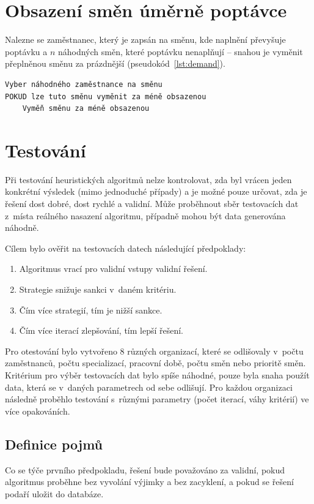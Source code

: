 \documentclass[a4paper,11pt,openany,twoside]{book}
\begin{document}
\section{Obsazení směn úměrně poptávce}
Nalezne se zaměstnanec, který je zapsán na směnu, kde naplnění převyšuje poptávku a $n$ náhodných směn, které poptávku nenaplňují – snahou je vyměnit přeplněnou směnu za prázdnější (pseudokód~\ref{lst:demand}).

\begin{lstlisting}[caption={Strategie pro obsazení směn dle poptávky}, label={lst:demand}]
Vyber náhodného zaměstnance na směnu
POKUD lze tuto směnu vyměnit za méně obsazenou
	Vyměň směnu za méně obsazenou
\end{lstlisting}

\section{Testování}

Při testování heuristických algoritmů nelze kontrolovat, zda byl vrácen jeden konkrétní výsledek (mimo jednoduché případy) a je možné pouze určovat, zda je řešení dost dobré, dost rychlé a validní. Může proběhnout sběr testovacích dat z~místa reálného nasazení algoritmu, případně mohou být data generována náhodně. \cite{rardin2001experimental}

Cílem bylo ověřit na testovacích datech následující předpoklady:
\begin{enumerate}
	\item Algoritmus vrací pro validní vstupy validní řešení.
	\item Strategie snižuje sankci v~daném kritériu.
	\item Čím více strategií, tím je nižší sankce.
	\item Čím více iterací zlepšování, tím lepší řešení.
\end{enumerate}


Pro otestování bylo vytvořeno 8 různých organizací, které se odlišovaly v~počtu zaměstnanců, počtu specializací, pracovní době, počtu směn nebo prioritě směn. Kritérium pro výběr testovacích dat bylo spíše náhodné, pouze byla snaha použít data, která se v~daných parametrech od sebe odlišují. Pro každou organizaci následně proběhlo testování s~různými parametry (počet iterací, váhy kritérií) ve více opakováních.


\subsection{Definice pojmů}
Co se týče prvního předpokladu, řešení bude považováno za validní, pokud algoritmus proběhne bez vyvolání výjimky a bez zacyklení, a pokud se řešení podaří uložit do databáze.
\end{document}
